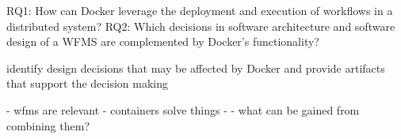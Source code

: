 


RQ1: How can Docker leverage the deployment and execution of workflows in a distributed system?
RQ2: Which decisions in software architecture and software design of a WFMS are complemented by Docker's functionality?

identify design decisions that may be affected by Docker and provide artifacts that support the decision making


  - wfms are relevant
  - containers solve things
  -
  - what can be gained from combining them?





